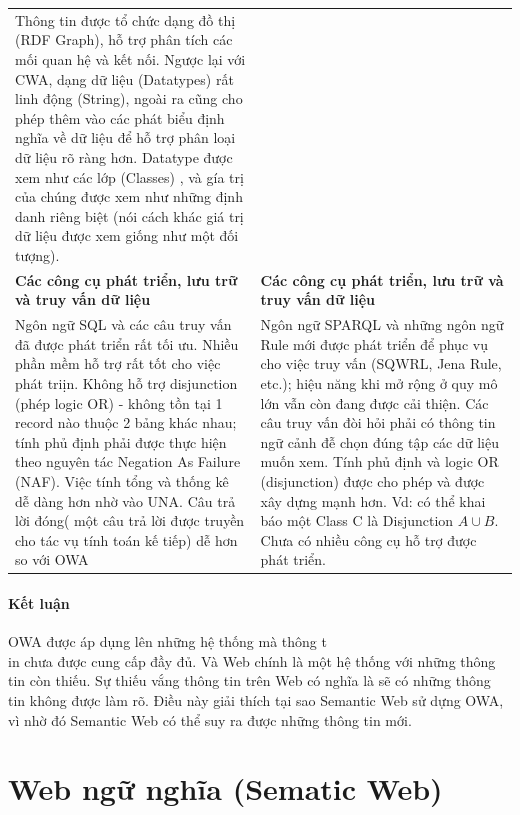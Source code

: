 \begin{longtable}{ p{7cm} p{7cm} }
Thông tin được tổ chức dạng đồ thị (RDF Graph), hỗ trợ phân tích các mối quan hệ và kết nối. Ngược lại với CWA, dạng dữ liệu (Datatypes) rất linh động (String), ngoài ra cũng cho phép thêm vào các phát biểu định nghĩa về dữ liệu để hỗ trợ phân loại dữ liệu rõ ràng hơn. Datatype được xem như các lớp (Classes) , và gía trị của chúng được xem như những định danh riêng biệt (nói cách khác giá trị dữ liệu được xem giống như một đối tượng).
\\
\textbf{Các công cụ phát triển, lưu trữ và truy vấn dữ liệu}
&
\textbf{Các công cụ phát triển, lưu trữ và truy vấn dữ liệu}
\\
Ngôn ngữ SQL và các câu truy vấn đã được phát triển rất tối ưu. Nhiều phần mềm hỗ trợ rất tốt cho việc phát triịn. Không hỗ trợ disjunction (phép logic OR) - không tồn tại 1 record nào thuộc 2 bảng khác nhau; tính phủ định phải được thực hiện theo nguyên tác Negation As Failure (NAF). Việc tính tổng và thống kê dễ dàng hơn nhờ vào UNA. Câu trả lời đóng( một câu trả lời được truyền cho tác vụ tính toán kế tiếp) dễ hơn so với OWA
&
Ngôn ngữ SPARQL và những ngôn ngữ Rule mới được phát triển để phục vụ cho việc truy vấn (SQWRL, Jena Rule, etc.); hiệu năng khi mở rộng ở quy mô lớn vẫn còn đang được cải thiện.
Các câu truy vấn đòi hỏi phải có thông tin ngữ cảnh đễ chọn đúng tập các dữ liệu muốn xem.
Tính phủ định và logic OR (disjunction) được cho phép và được xây dựng mạnh hơn. Vd: có thể khai báo một Class C là Disjunction $A \cup B$. Chưa có nhiều công cụ hỗ trợ được phát triển.
\\ 
\end{longtable}
{\let\thefootnote\relax{}
	\let\thefootnote\relax{}
}
\paragraph{Kết luận} OWA được áp dụng lên những hệ thống mà thông t
\\in chưa được cung cấp đầy đủ. Và Web chính là một hệ thống với những thông tin còn thiếu. Sự thiếu vắng thông tin trên Web có nghĩa là sẽ có những thông tin không được làm rõ. Điều này giải thích tại sao Semantic Web sử dựng OWA, vì nhờ đó Semantic Web có thể suy ra được những thông tin mới.
\section{Web ngữ nghĩa (Sematic Web)}
